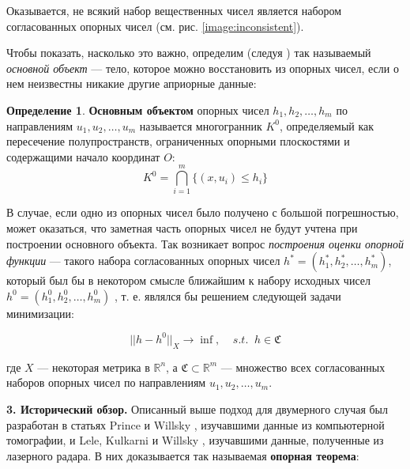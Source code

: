 \documentclass[a4paper, 10pt]{article}
\theoremstyle{definition}
\newtheorem{SmartDefinition}{Определение}
\theoremstyle{plain}
\theoremstyle{plain}
\begin{document}
Оказывается, не всякий набор вещественных чисел является набором согласованных
опорных чисел (см. рис. \ref{image:inconsistent}).

Чтобы показать, насколько это важно, определим (следуя
\cite{Prince:1990:RCS:81024.81035}) так называемый \textit{основной объект} ---
тело, которое можно восстановить из опорных чисел, если о нем неизвестны никакие
другие априорные данные:

\begin{SmartDefinition}
 \label{def:basic-object}
 \textbf{Основным объектом} опорных чисел $h_{1}, h_{2}, \ldots, h_{m}$ по
 направлениям $u_{1}, u_{2}, \ldots, u_{m}$ называется многогранник $K^{0}$,
 определяемый как пересечение полупространств, ограниченных опорными плоскостями
 и содержащими начало координат $O$:
 \begin{equation}
  K^{0} = \bigcap \limits_{i = 1}^{m}\{(x, u_{i}) \leq h_{i}\}
 \end{equation}
\end{SmartDefinition}

В случае, если одно из опорных чисел было получено с большой погрешностью, может
оказаться, что заметная часть опорных чисел не будут учтена при построении
основного объекта. Так возникает вопрос \textit{построения оценки опорной
функции} --- такого набора согласованных опорных чисел
$h^{*} = (h^{*}_{1}, h^{*}_{2}, \ldots, h^{*}_{m})$, который был бы в некотором
смысле ближайшим к набору исходных чисел
$h^{0} = (h^{0}_{1}, h^{0}_{2}, \ldots, h^{0}_{m})$
, т. е. являлся бы решением следующей задачи
минимизации:

\begin{equation}
 \label{equation:abstract-problem}
 ||h - h^{0} ||_{X} \to \inf, \;\;\;\; s. t. \;\; h \in \mathfrak{C}
\end{equation}

где $X$ --- некоторая метрика в $\mathbb{R}^{n}$, а
$\mathfrak{C} \subset \mathbb{R}^{m}$ --- множество всех согласованных наборов
опорных чисел по направлениям $u_{1}, u_{2}, \ldots, u_{m}$.

\textbf{3. Исторический обзор.} Описанный выше подход для двумерного случая был
разработан в статьях Prince и Willsky \cite{Prince:1990:RCS:81024.81035},
изучавшими данные из компьютерной томографии,  и Lele, Kulkarni и Willsky
\cite{Lele:92}, изучавшими данные, полученные из лазерного радара. В них
доказывается так называемая \textbf{опорная теорема}:
\end{document}
